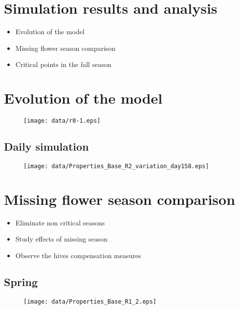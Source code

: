 \documentclass[
paper=128mm:96mm, %
fontsize=11pt, %
pagesize, %
parskip=half-, %
]{scrartcl} %
\theoremstyle{mythmstyle} %
\begin{document}
\section{Simulation results and analysis}

\begin{itemize}
\item Evolution of the model
\item Missing flower season comparison
\item Critical points in the fall season
\end{itemize}
\clearpage

\section{Evolution of the model}
\begin{figure}[H]
			\centering
			\texttt{[image: data/r0-1.eps]}
\end{figure}
\clearpage
\subsection{Daily simulation}
\begin{figure}[H]
			\centering
			\texttt{[image: data/Properties\_Base\_R2\_variation\_day158.eps]}
\end{figure}
\clearpage
\section{Missing flower season comparison}
\begin{itemize}
\item Eliminate non critical seasons
\item Study effects of missing season
\item Observe the hives compensation measures
\end{itemize}
\clearpage

\subsection{Spring}
\begin{figure}[H]
			\centering
			\texttt{[image: data/Properties\_Base\_R1\_2.eps]}
\end{figure}
\clearpage
\end{document}
